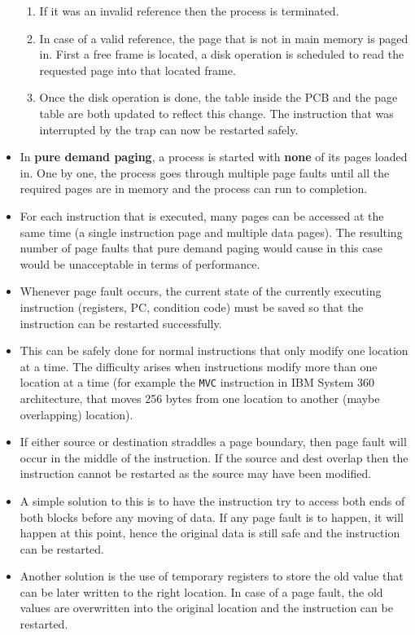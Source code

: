 \documentclass{article}
\theoremstyle{plain}
\theoremstyle{definition}
\begin{document}
\begin{itemize}
\begin{enumerate}
        \item If it was an invalid reference then the process is terminated.
        
        \item In case of a valid reference, the page that is not in main memory is paged in. First a free frame is located, a disk operation is scheduled to read the requested page into that located frame.
        
        \item Once the disk operation is done, the table inside the PCB and the page table are both updated to reflect this change. The instruction that was interrupted by the trap can now be restarted safely. 
    \end{enumerate}
    
    \item In \textbf{pure demand paging}, a process is started with \textbf{none} of its pages loaded in. One by one, the process goes through multiple page faults until all the required pages are in memory and the process can run to completion. 
    
    \item For each instruction that is executed, many pages can be accessed at the same time (a single instruction page and multiple data pages). The resulting number of page faults that pure demand paging would cause in this case would be unacceptable in terms of performance.
    
    \item Whenever page fault occurs, the current state of the currently executing instruction (registers, PC, condition code) must be saved so that the instruction can be restarted successfully. 
    
    \item This can be safely done for normal instructions that only modify one location at a time. The difficulty arises when instructions modify more than one location at a time (for example the \texttt{MVC} instruction in IBM System 360 architecture, that moves 256 bytes from one location to another (maybe overlapping) location). 
    
    \item If either source or destination straddles a page boundary, then page fault will occur in the middle of the instruction. If the source and dest overlap then the instruction cannot be restarted as the source may have been modified. 
    
    \item A simple solution to this is to have the instruction try to access both ends of both blocks before any moving of data. If any page fault is to happen, it will happen at this point, hence the original data is still safe and the instruction can be restarted. 
    
    \item Another solution is the use of temporary registers to store the old value that can be later written to the right location. In case of a page fault, the old values are overwritten into the original location and the instruction can be restarted. 
\end{itemize}
\end{document}
